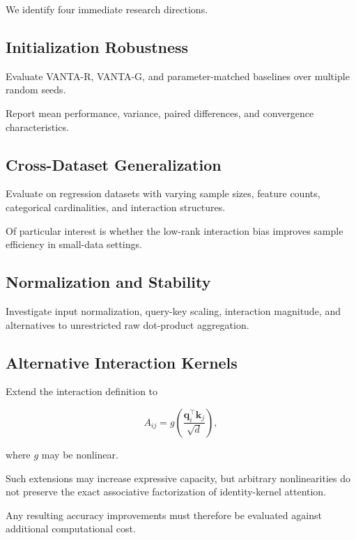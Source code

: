 \documentclass[11pt,a4paper]{article}
\begin{document}
We identify four immediate research directions.

\subsection{Initialization Robustness}

Evaluate VANTA-R, VANTA-G, and
parameter-matched baselines over
multiple random seeds.

Report mean performance, variance,
paired differences, and convergence
characteristics.

\subsection{Cross-Dataset Generalization}

Evaluate on regression datasets
with varying sample sizes,
feature counts, categorical
cardinalities, and interaction
structures.

Of particular interest is whether
the low-rank interaction bias improves
sample efficiency in small-data settings.

\subsection{Normalization and Stability}

Investigate input normalization,
query-key scaling, interaction magnitude,
and alternatives to unrestricted
raw dot-product aggregation.

\subsection{Alternative Interaction Kernels}

Extend the interaction definition to

\begin{equation}
A_{ij}
=
g\left(
\frac{\mathbf{q}_i^\top\mathbf{k}_j}
{\sqrt d}
\right),
\end{equation}

where $g$ may be nonlinear.

Such extensions may increase expressive
capacity, but arbitrary nonlinearities
do not preserve the exact associative
factorization of identity-kernel
attention.

Any resulting accuracy improvements
must therefore be evaluated against
additional computational cost.

\end{document}
